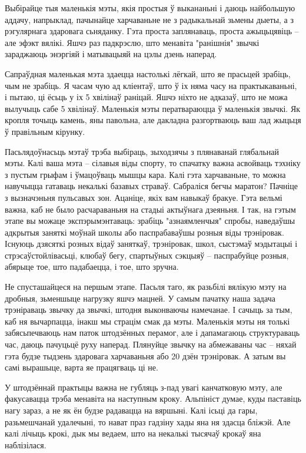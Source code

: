 Выбірайце тыя маленькія мэты, якія простыя ў выкананьні і даюць найбольшую аддачу, напрыклад, пачынайце харчаваньне не з радыкальнай зьмены дыеты, а з рэгулярнага здаровага сьняданку. Гэта проста заплянаваць, проста ажыцьцявіць – але эфэкт вялікі. Яшчэ раз падкрэслю, што менавіта "ранішнія" звычкі зараджаюць энэргіяй і матывацыяй на цэлы дзень наперад.

Сапраўдная маленькая мэта здаецца настолькі лёгкай, што яе прасьцей зрабіць, чым не зрабіць. Я часам чую ад кліентаў, што ў іх няма часу на практыкаваньні, і пытаю, ці ёсьць у іх 5 хвілінаў раніцай. Яшчэ ніхто не адказаў, што не можа вылучыць сабе 5 хвілінаў. Маленькія мэты ператвараюцца ў маленькія звычкі. Як кропля точыць камень, яны павольна, але дакладна разгортваюць ваш лад жыцьця ў правільным кірунку.

Пасьлядоўнасьць мэтаў трэба выбіраць, зыходзячы з плянаванай глябальнай мэты. Калі ваша мэта – сілавыя віды спорту, то спачатку важна асвойваць тэхніку з пустым грыфам і ўмацоўваць мышцы кара. Калі гэта харчаваньне, то можна навучыцца гатаваць некалькі базавых страваў. Сабраліся бегчы маратон? Пачніце з вызначэньня пульсавых зон. Ацаніце, якіх вам навыкаў бракуе. Гэта вельмі важна, каб не было расчараваньня на стадыі актыўнага дзеяньня. І так, на гэтым этапе вы можаце экспэрымэнтаваць: зрабіць "азнаямленчыя" спробы, наведаўшы адкрытыя заняткі моўнай школы або паспрабаваўшы розныя віды трэніровак. Існуюць дзясяткі розных відаў заняткаў, трэніровак, школ, сыстэмаў мэдытацыі і стрэсаўстойлівасьці, клюбаў бегу, спартыўных сэкцыяў – паспрабуйце розныя, абярыце тое, што падабаецца, і тое, што зручна.

Не спусташайцеся на першым этапе. Пасьля таго, як разьбілі вялікую мэту на дробныя, зьменшыце нагрузку яшчэ мацней. У самым пачатку наша задача трэніраваць звычку да звычкі, штодня выконваючы намечанае. І сачыць за тым, каб ня вычарпацца, інакш мы страцім смак да мэты. Маленькія мэты ня толькі забясьпечваюць нам паток штодзённых перамог, але і дапамагаюць структураваць час, даюць пачуцьцё руху наперад. Плянуйце звычку на абмежаваны час – няхай гэта будзе тыдзень здаровага харчаваньня або 20 дзён трэніровак. А затым вы самі вырашыце, варта яе працягваць ці не.

У штодзённай практыцы важна не губляць з-пад увагі канчатковую мэту, але факусавацца трэба менавіта на наступным кроку. Альпініст думае, куды паставіць нагу зараз, а не як ён будзе радавацца на вяршыні. Калі ісьці да гары, разьмешчанай удалечыні, то нават праз гадзіну хады яна ня здасца бліжэй. Але калі лічыць крокі, дык мы ведаем, што на некалькі тысячаў крокаў яна наблізілася.

